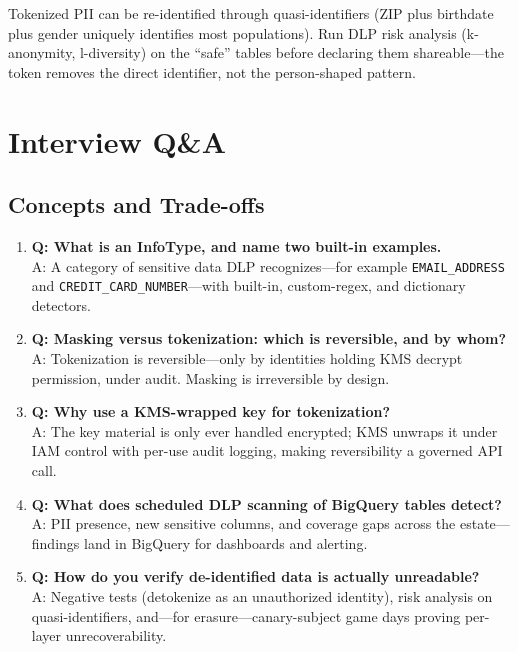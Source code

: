 \begin{pitfall}
Tokenized PII can be re-identified through quasi-identifiers (ZIP plus birthdate plus gender uniquely identifies most populations). Run DLP risk analysis (k-anonymity, l-diversity) on the ``safe'' tables before declaring them shareable---the token removes the direct identifier, not the person-shaped pattern.
\end{pitfall}

\section{Interview Q\&A}
\subsection{Concepts and Trade-offs}
\begin{enumerate}
    \item \textbf{Q: What is an InfoType, and name two built-in examples.}\\
    A: A category of sensitive data DLP recognizes---for example \texttt{EMAIL\_ADDRESS} and \texttt{CREDIT\_CARD\_NUMBER}---with built-in, custom-regex, and dictionary detectors.

    \item \textbf{Q: Masking versus tokenization: which is reversible, and by whom?}\\
    A: Tokenization is reversible---only by identities holding KMS decrypt permission, under audit. Masking is irreversible by design.

    \item \textbf{Q: Why use a KMS-wrapped key for tokenization?}\\
    A: The key material is only ever handled encrypted; KMS unwraps it under IAM control with per-use audit logging, making reversibility a governed API call.

    \item \textbf{Q: What does scheduled DLP scanning of BigQuery tables detect?}\\
    A: PII presence, new sensitive columns, and coverage gaps across the estate---findings land in BigQuery for dashboards and alerting.

    \item \textbf{Q: How do you verify de-identified data is actually unreadable?}\\
    A: Negative tests (detokenize as an unauthorized identity), risk analysis on quasi-identifiers, and---for erasure---canary-subject game days proving per-layer unrecoverability.
\end{enumerate}

